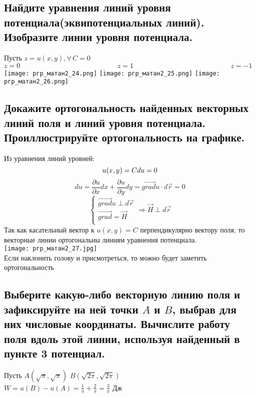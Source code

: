 \documentclass{article}
\begin{document}
    \subsection{Найдите уравнения линий уровня потенциала(эквипотенциальных линий). Изобразите линии уровня потенциала.}
    Пусть $z = u(x,y), \forall \, C = 0$\\
    $
    z = 0 
    \;\;\;\;\;\;\;\;\;\;\;\;\;\;\;\;\;\;\;\;\;\;\;\;\;\;\;\;\;\;\;\;\;\;\;\;
    \;\;\;\;\;\;\;\;\;\;\;\;\;\;
    z = 1
    \;\;\;\;\;\;\;\;\;\;\;\;\;\;\;\;\;\;\;\;\;\;\;\;\;\;\;\;\;\;\;\;\;\;\;\;
    \;\;\;\;\;\;\;\;\;\;\;\;\;\;
    z = -1$ \\
    \texttt{[image: ргр\_матан2\_24.png]} 
    \texttt{[image: ргр\_матан2\_25.png]} 
    \texttt{[image: ргр\_матан2\_26.png]} 
    \subsection{Докажите ортогональность найденных векторных линий поля и линий уровня потенциала. Проиллюстрируйте ортогональность на графике.}
    Из уравнения линий уровней: 
    \begin{equation*}
        u(x,y) = C \\
        du = 0 \\
    \end{equation*}
    \begin{equation*}
        du = \frac{\partial u}{\partial x} dx + \frac{\partial u}{\partial y} dy = \overrightarrow{grad} u \cdot d\overrightarrow{r} = 0
    \end{equation*}
    \begin{equation*}
        \begin{cases}
            \overrightarrow{grad} u \perp d \overrightarrow{r} \\
            \overrightarrow{grad} = \overrightarrow{H} \\
        \end{cases}
        \Rightarrow
        \overrightarrow{H} \perp d\overrightarrow{r}
    \end{equation*}
    Так как касательный вектор к $u(x,y) =C $ перпендикулярно вектору поля, то векторные линии ортогональны линиям уравнения потенциала.\\
    \texttt{[image: ргр\_матан2\_27.jpg]} \\
    Если наклонить голову и присмотреться, то можно будет заметить ортогональность
    \subsection{Выберите какую-либо векторную линию поля и зафиксируйте на ней точки $A$ и $B$, выбрав для них числовые
    координаты. Вычислите работу поля вдоль этой линии, используя найденный в пункте 3 потенциал.}
    Пусть $A(\sqrt{\pi}, \sqrt{\pi})$ $B(\sqrt{2\pi}, \sqrt{2\pi})$ \\
    $W = u(B) - u(A) = \frac{1}{\pi} + \frac{2}{\pi} = \frac{3}{\pi}$ Дж
\end{document}
